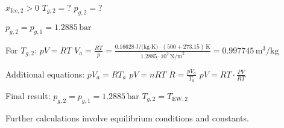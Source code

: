\( x_{\text{Ice},2} > 0 \)  
\( T_{g,2} = ? \)  
\( p_{g,2} = ? \)  

\( p_{g,2} = p_{g,1} = 1.2885 \, \text{bar} \)  

For \( T_{g,2} \):  
\( pV = RT \)  
\( V_a = \frac{RT}{p} = \frac{0.16628 \, \text{J/(kg·K)} \cdot (500 + 273.15) \, \text{K}}{1.2885 \cdot 10^2 \, \text{N/m}^2} = 0.997745 \, \text{m}^3/\text{kg} \)  

Additional equations:  
\( pV_a = R T_a \)  
\( pV = nRT \)  
\( R = \frac{pV_a}{T_a} \)  
\( pV = RT \cdot \frac{PV}{R T} \)  

Final result:  
\( p_{g,2} = p_{g,1} = 1.2885 \, \text{bar} \)  
\( T_{g,2} = T_{\text{EW},2} \)  

Further calculations involve equilibrium conditions and constants.